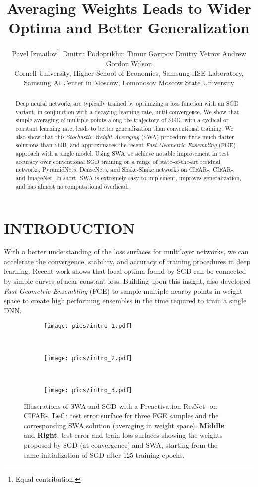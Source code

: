 \documentclass[letterpaper]{article}
\title{Averaging Weights Leads to Wider Optima and Better Generalization}
\author{
  Pavel Izmailov\thanks{\text{ }\text{ }Equal contribution.}\,  
  \quad Dmitrii Podoprikhin 
  \quad Timur Garipov 
  \quad Dmitry Vetrov 
  \quad Andrew Gordon Wilson \\ 
  Cornell University, 
  Higher School of Economics, 
  Samsung-HSE Laboratory, \\
  Samsung AI Center in Moscow, 
  Lomonosov Moscow State University}
\begin{document}
\maketitle

\begin{abstract}


Deep neural networks are typically trained by optimizing a loss function with an
SGD variant, in conjunction with a decaying learning rate, until convergence.  We show that 
simple averaging of multiple points along the trajectory of SGD, with a cyclical
or constant learning rate, leads to better generalization than conventional training.
We also show that this \emph{Stochastic Weight Averaging} (SWA)
procedure finds much flatter solutions than SGD, and approximates the 
recent \emph{Fast Geometric Ensembling} (FGE) approach with a single model.
Using SWA we achieve notable improvement in test accuracy over
conventional SGD training on a range of state-of-the-art residual networks,
PyramidNets, DenseNets, and Shake-Shake networks on CIFAR-, 
CIFAR-, and ImageNet.  In short, SWA is extremely easy to implement, 
improves generalization, and has almost no computational overhead.
  
\end{abstract}

\section{INTRODUCTION}
\label{sec:intro}

With a better understanding of the loss surfaces for multilayer networks, we can accelerate the convergence, stability, and accuracy of training procedures in deep learning. Recent work \citep{garipov2018, draxler2018} shows 
that local optima found by SGD can be connected by simple curves of near constant loss.  Building upon this insight, \citet{garipov2018} also developed \emph{Fast Geometric Ensembling} (FGE) to sample multiple nearby points in weight space to create high performing ensembles in the time required to train a single DNN.

\begin{figure*}[!h]
	\centering
	\begin{subfigure}{0.27\textwidth}
		\texttt{[image: pics/intro\_1.pdf]}
	\end{subfigure}
	~~~~~~
	\begin{subfigure}{0.27\textwidth}
		\texttt{[image: pics/intro\_2.pdf]}
	\end{subfigure}
	~~~~~~
	\begin{subfigure}{0.27\textwidth}
		\texttt{[image: pics/intro\_3.pdf]}
	\end{subfigure}
  \caption{
    Illustrations of SWA and SGD with a Preactivation ResNet- on CIFAR-\protect\footnotemark. 
    \textbf{Left}: test error surface for three
    FGE samples and the corresponding SWA solution (averaging in weight space). \textbf{Middle} and \textbf{Right}: 
    test error and train loss surfaces showing the weights proposed by SGD (at convergence)
    and SWA, starting from the same initialization of SGD after 125 training epochs.
	}
	\label{fig:intro}
\end{figure*}
  
\end{document}
